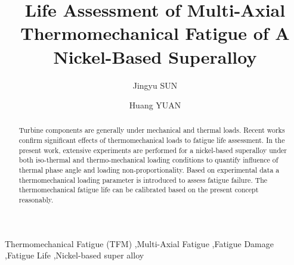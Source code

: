 \documentclass[preprint,5p,twocolumn,11pt,sort&compress]{elsarticle}
\begin{document}

\begin{frontmatter}



\title{Life Assessment of Multi-Axial Thermomechanical Fatigue of A Nickel-Based Superalloy}


\author{Jingyu SUN}
\author{Huang YUAN}

\address[label1]{School of Aerospace Engineering, Tsinghua University, Beijing, China}

\begin{abstract}
Turbine components are generally under mechanical and thermal loads. Recent works confirm significant effects of thermomechanical loads to fatigue life assessment. In the present work, extensive experiments are performed for a nickel-based superalloy under both iso-thermal and thermo-mechanical loading conditions to quantify influence of thermal phase angle and loading non-proportionality. Based on experimental data a thermomechanical loading parameter is introduced to assess fatigue failure. The thermomechanical fatigue life can be calibrated based on the present concept reasonably.
\end{abstract}

%
\begin{keyword}
Thermomechanical Fatigue (TFM) \sep Multi-Axial Fatigue \sep Fatigue Damage \sep Fatigue Life \sep Nickel-based super alloy

\end{keyword}
\end{frontmatter}
\end{document}
